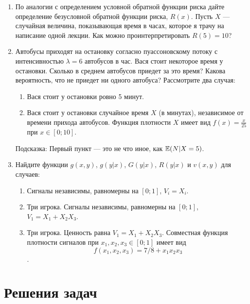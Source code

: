 \begin{enumerate}
\item По аналогии с определением условной обратной функции риска дайте определение безусловной обратной функции риска, $ R(x) $. Пусть $ X $ — случайная величина, показывающая время в часах, которое я трачу на написание одной лекции. Как можно проинтерпретировать $ R(5)=10 $?
\item Автобусы приходят на остановку согласно пуассоновскому потоку с интенсивностью $ \lambda=6 $ автобусов в час. Вася стоит некоторое время у остановки. Сколько в среднем автобусов приедет за это время? Какова вероятность, что не приедет ни одного автобуса? Рассмотрите два случая:
\begin{enumerate}
\item Вася стоит у остановки ровно 5 минут.
\item Вася стоит у остановки случайное время $ X $ (в минутах), независимое от времени прихода автобусов. Функция плотности $ X $ имеет вид $ f(x)= \frac{x}{25}$ при $ x\in [0;10] $.
\end{enumerate}
Подсказка: Первый пункт — это не что иное, как $ \operatorname{\mathbb{E}}(N|X=5) $.
\item Найдите функции $ g(x,y)$, $ g(y|x)$, $ G(y|x)$,  $R(y|x)$ и $v(x,y)$ для случаев:
\label{ex_vxy}
\begin{enumerate}
\item Сигналы независимы, равномерны на $ [0;1] $, $ V_{i}=X_{i} $.
\item Три игрока. Сигналы независимы, равномерны на $ [0;1] $, $ V_{1}=X_{1}+X_{2}X_{3} $.
\item Три игрока. Ценность равна $ V_{1}=X_{1}+X_{2}X_{3} $. Совместная функция плотности сигналов при $ x_{1},x_{2},x_{3}\in[0;1]$ имеет вид \[
f(x_{1},x_{2},x_{3})=7/8+x_{1}x_{2}x_{3}
\].
\end{enumerate}
\end{enumerate}


\section{Решения задач}

